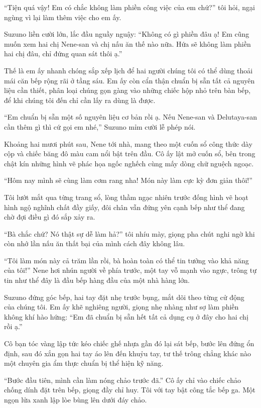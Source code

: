 \documentclass[../main.tex]{subfiles}
\begin{document}
``Tiện quá vậy! Em có chắc không làm phiền công việc của em chứ?'' tôi hỏi, ngại ngùng vì lại làm thêm việc cho em ấy.

Suzuno liền cười lớn, lắc đầu nguầy nguậy: ``Không có gì phiền đâu ạ! Em cũng muốn xem hai chị Nene-san và chị nấu ăn thế nào nữa. Hứa sẽ không làm phiền hai chị đâu, chỉ đứng quan sát thôi ạ.''

Thế là em ấy nhanh chóng sắp xếp lịch để hai người chúng tôi có thể dùng thoải mái căn bếp rộng rãi ở tầng sáu. Em ấy còn cẩn thận chuẩn bị sẵn tất cả nguyên liệu cần thiết, phân loại chúng gọn gàng vào những chiếc hộp nhỏ trên bàn bếp, để khi chúng tôi đến chỉ cần lấy ra dùng là được.

``Em chuẩn bị sẵn một số nguyên liệu cơ bản rồi ạ. Nếu Nene-san và Delutaya-san cần thêm gì thì cứ gọi em nhé,'' Suzuno mỉm cười lễ phép nói.

\ct

Khoảng hai mươi phút sau, Nene tới nhà, mang theo một cuốn sổ công thức dày cộp và chiếc băng đô màu cam nổi bật trên đầu. Cô ấy lật mở cuốn sổ, bên trong chật kín những hình vẽ phác họa ngốc nghếch cùng mấy dòng chữ nguệch ngoạc.

``Hôm nay mình sẽ cùng làm cơm rang nha! Món này làm cực kỳ đơn giản thôi!''

Tôi lướt mắt qua từng trang sổ, lòng thầm ngạc nhiên trước đống hình vẽ hoạt hình ngộ nghĩnh chất đầy giấy, đôi chân vẫn đứng yên cạnh bếp như thể đang chờ đợi điều gì đó sắp xảy ra.

``Bà chắc chứ? Nó thật sự dễ làm hả?'' tôi nhíu mày, giọng pha chút nghi ngờ khi còn nhớ lần nấu ăn thất bại của mình cách đây không lâu.

``Tôi làm món này cả trăm lần rồi, bà hoàn toàn có thể tin tưởng vào khả năng của tôi!'' Nene hơi nhún người về phía trước, một tay vỗ mạnh vào ngực, trông tự tin như thể đây là đầu bếp hàng đầu của một nhà hàng lớn.

Suzuno đứng góc bếp, hai tay đặt nhẹ trước bụng, mắt dõi theo từng cử động của chúng tôi. Em ấy khẽ nghiêng người, giọng nhẹ nhàng như sợ làm phiền không khí hào hứng: ``Em đã chuẩn bị sẵn hết tất cả dụng cụ ở đây cho hai chị rồi ạ.''

Cô bạn tóc vàng lập tức kéo chiếc ghế nhựa gần đó lại sát bếp, bước lên đứng ổn định, sau đó xắn gọn hai tay áo lên đến khuỷu tay, tư thế trông chẳng khác nào một chuyên gia ẩm thực chuẩn bị thể hiện kỹ năng.

``Bước đầu tiên, mình cần làm nóng chảo trước đã.'' Cô ấy chỉ vào chiếc chảo chống dính đặt trên bếp, giọng đầy chỉ huy. Tôi với tay bật công tắc bếp ga. Một ngọn lửa xanh lập lòe bùng lên dưới đáy chảo.
\end{document}
